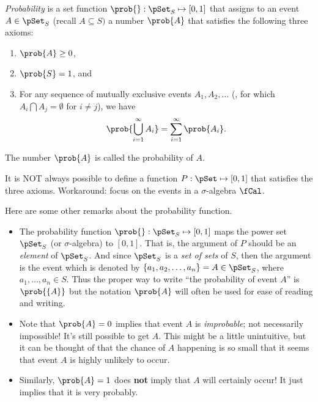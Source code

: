 \begin{mydefinition}[Probability]
    \emph{Probability} is a set function $\prob{}:\pSet_{S}\mapsto [0,1]$ that assigns to an event $A\in\pSet_{S}$ (recall $A\subseteq S)$ a number $\prob{A}$ that satisfies the following three axioms:
    \begin{enumerate}
        \item $\prob{A}\geq0$,
        \item $\prob{S}=1$, and
        \item For any sequence of mutually exclusive events $A_{1}, A_{2}, \ldots$ (\ie, for which $A_{i}\bigcap A_{j}=\emptyset$ for $i\neq j$), we have
        \begin{align}
            \prob{\bigcup_{i=1}^{\infty} A_{i}}=\sum_{i=1}^{\infty} \prob{A_{i}}.
        \end{align}
    \end{enumerate}
    The number $\prob{A}$ is called the probability of $A$.
\end{mydefinition}
\begin{remark}
        It is NOT always possible to define a function $P:\pSet\mapsto[0,1]$ that satisfies the three axioms.
        Workaround: focus on the events in a $\sigma$-algebra $\fCal$.
        
        Here are some other remarks about the probability function.
        \begin{myBlueBox}
            \begin{itemize}
                \item The probability function $\prob{}:\pSet_{S}\mapsto[0,1]$ maps  the power set $\pSet_{S}$ (or $\sigma$-algebra) to $[0,1]$. That is, the argument of $P$ should be an \emph{element} of $\pSet_{S}$. And since $\pSet_{S}$ is a \emph{set of sets} of $S$, then the argument is the event which is denoted by $\{a_{1},a_{2},\ldots,a_{n}\}=A\in\pSet_{S}$, where $a_{1}, \ldots, a_{n} \in S$.  Thus the proper way to write ``the probability of event $A$'' is $\prob{\{A\}}$ but the notation $\prob{A}$ will often be used for ease of reading and writing.

                \item Note that $\prob{A} = 0$ implies that event $A$ is \emph{improbable}; not necessarily impossible! It's still possible to get $A$. This might be a little unintuitive, but it can be thought of that the chance of $A$ happening is so small that it seems that event $A$ is highly unlikely to occur.
                \item Similarly, $\prob{A}= 1$ does \textbf{not} imply that $A$ will certainly occur! It just implies that it is very probably.
            \end{itemize}
        \end{myBlueBox}
\end{remark}

